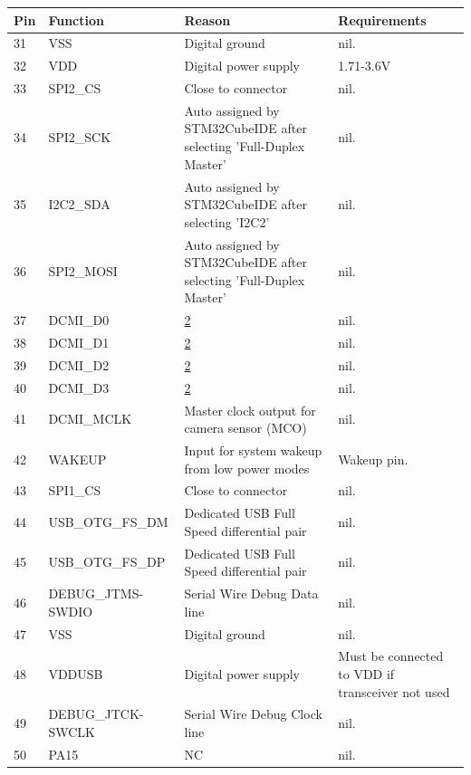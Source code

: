 \begin{table}[H]
    \ContinuedFloat
    \centering
    \begin{tabular}{|l|p{3cm}|p{6.5cm}|p{3.5cm}|}
        \hline
        \textbf{Pin} & \textbf{Function} & \textbf{Reason} & \textbf{Requirements} \\
        \hline
        31 & VSS & Digital ground & nil. \\ \hline
        32 & VDD & Digital power supply & 1.71-3.6V \\ \hline
        33 & SPI2\_CS & Close to connector & nil. \\ \hline
        34 & SPI2\_SCK & Auto assigned by STM32CubeIDE after selecting 'Full-Duplex Master' & nil. \\ \hline
        35 & I2C2\_SDA & Auto assigned by STM32CubeIDE after selecting 'I2C2' & nil. \\ \hline
        36 & SPI2\_MOSI & Auto assigned by STM32CubeIDE after selecting 'Full-Duplex Master' & nil. \\ \hline
        37 & DCMI\_D0 & \hyperlink{dcmi-reason}{2} & nil. \\ \hline
        38 & DCMI\_D1 & \hyperlink{dcmi-reason}{2} & nil. \\ \hline
        39 & DCMI\_D2 & \hyperlink{dcmi-reason}{2} & nil. \\ \hline
        40 & DCMI\_D3 & \hyperlink{dcmi-reason}{2} & nil. \\ \hline
        41 & DCMI\_MCLK & Master clock output for camera sensor (MCO) & nil. \\ \hline
        42 & WAKEUP & Input for system wakeup from low power modes & Wakeup pin. \\ \hline
        43 & SPI1\_CS & Close to connector & nil. \\ \hline
        44 & USB\_OTG\_FS\_DM & Dedicated USB Full Speed differential pair & nil. \\ \hline
        45 & USB\_OTG\_FS\_DP & Dedicated USB Full Speed differential pair & nil. \\ \hline
        46 & DEBUG\_JTMS-SWDIO & Serial Wire Debug Data line & nil. \\ \hline
        47 & VSS & Digital ground & nil. \\ \hline
        48 & VDDUSB & Digital power supply & Must be connected to VDD if transceiver not used \\ \hline
        49 & DEBUG\_JTCK-SWCLK & Serial Wire Debug Clock line & nil. \\ \hline
        50 & PA15 & NC & nil. \\ \hline

\end{tabular}
\end{table}
